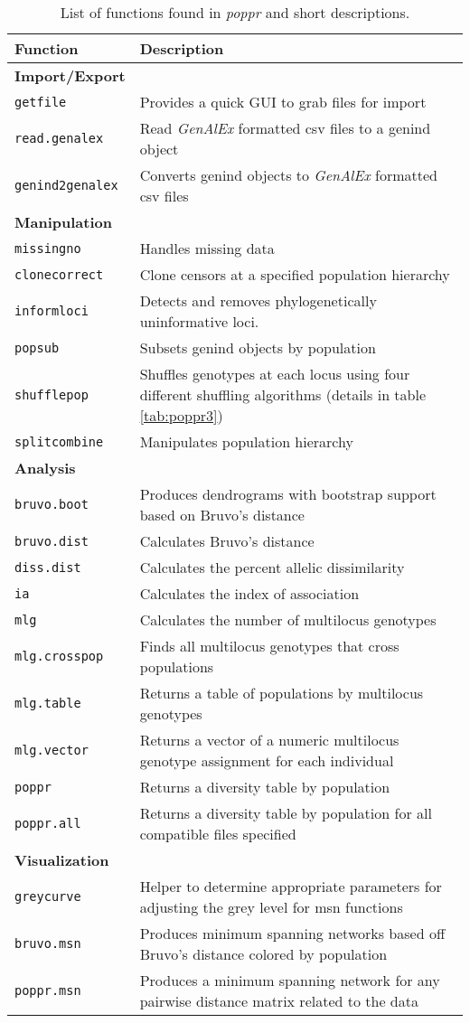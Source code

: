 \begin{sidewaystable}[ph!]
\caption{List of functions found in \textit{poppr} and short descriptions.}
\label{tab:poppr1}
\begin{tabular}{ll}
\hline
Function & Description \\ 
\hline
\textbf{Import/Export} & \\
\texttt{getfile} & Provides a quick GUI to grab files for import \\
\texttt{read.genalex} & Read \textit{GenAlEx} formatted csv files to a genind object \\
\texttt{genind2genalex} & Converts genind objects to \textit{GenAlEx} formatted csv files \\
\hline
\textbf{Manipulation} & \\
\texttt{missingno} & Handles missing data \\
\texttt{clonecorrect} & Clone censors at a specified population hierarchy \\
\texttt{informloci} & Detects and removes phylogenetically uninformative loci. \\
\texttt{popsub} & Subsets genind objects by population \\
\texttt{shufflepop} & Shuffles genotypes at each locus using four different shuffling algorithms (details in table \ref{tab:poppr3}) \\
\texttt{splitcombine} & Manipulates population hierarchy \\ 
\hline
\textbf{Analysis} & \\
\texttt{bruvo.boot} & Produces dendrograms with bootstrap support based on Bruvo's distance \\
\texttt{bruvo.dist} & Calculates Bruvo's distance \\
\texttt{diss.dist} & Calculates the percent allelic dissimilarity \\
\texttt{ia} & Calculates the index of association \\
\texttt{mlg} & Calculates the number of multilocus genotypes \\
\texttt{mlg.crosspop} & Finds all multilocus genotypes that cross populations \\
\texttt{mlg.table} & Returns a table of populations by multilocus genotypes \\
\texttt{mlg.vector} & Returns a vector of a numeric multilocus genotype assignment for each individual \\
\texttt{poppr} & Returns a diversity table by population \\
\texttt{poppr.all} & Returns a diversity table by population for all compatible files specified \\
\hline
\textbf{Visualization} & \\
\texttt{greycurve} & Helper to determine appropriate parameters for adjusting the grey level for msn functions \\
\texttt{bruvo.msn} & Produces minimum spanning networks based off Bruvo's distance colored by population \\
\texttt{poppr.msn} & Produces a minimum spanning network for any pairwise distance matrix related to the data \\
\hline

\end{tabular}
\end{sidewaystable}
